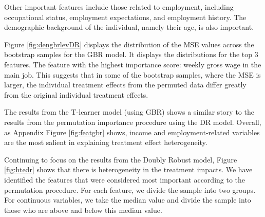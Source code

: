 \documentclass[12pt, a4paper]{article}
\begin{document}
Other important features include those related to employment, including occupational status, employment expectations, and employment history. The demographic background of the individual, namely their age, is also important. 


Figure \ref{fig:dengbrlevDR} displays the distribution of the MSE values across the bootstrap samples for the GBR model. It displays the distributions for the top 3 features. The feature with the highest importance score: weekly gross wage in the main job. This suggests that in some of the bootstrap samples, where the MSE is larger, the individual treatment effects from the permuted data differ greatly from the original individual treatment effects.

The results from the T-learner model (using GBR) shows a similar story to the results from the permutation importance procedure using the DR model. Overall, as Appendix Figure \ref{fig:featgbr} shows, income and employment-related variables are the most salient in explaining treatment effect heterogeneity. 



Continuing to focus on the results from the Doubly Robust model, Figure \ref{fig:htedr} shows that there is heterogeneity in the treatment impacts. We have identified the features that were considered most important according to the permutation procedure. For each feature, we divide the sample into two groups. For continuous variables, we take the median value and divide the sample into those who are above and below this median value. 
\end{document}
